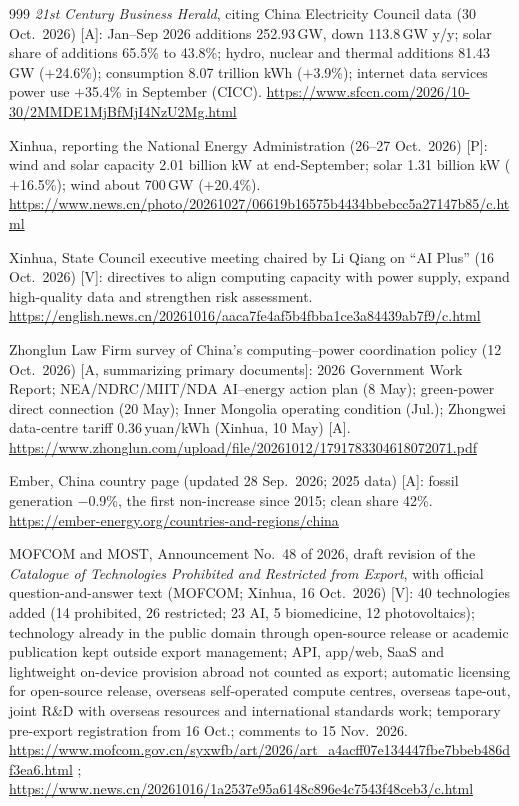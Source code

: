 \begin{thebibliography}{999}
 \emph{21st Century Business Herald}, citing China Electricity Council data (30 Oct.\ 2026) [A]: Jan--Sep 2026 additions 252.93\,GW, down 113.8\,GW y/y; solar share of additions 65.5\% to 43.8\%; hydro, nuclear and thermal additions 81.43\,GW ($+$24.6\%); consumption 8.07 trillion kWh ($+$3.9\%); internet data services power use $+$35.4\% in September (CICC). \url{https://www.sfccn.com/2026/10-30/2MMDE1MjBfMjI4NzU2Mg.html}

 Xinhua, reporting the National Energy Administration (26--27 Oct.\ 2026) [P]: wind and solar capacity 2.01 billion kW at end-September; solar 1.31 billion kW ($+$16.5\%); wind about 700\,GW ($+$20.4\%). \url{https://www.news.cn/photo/20261027/06619b16575b4434bbebcc5a27147b85/c.html}

 Xinhua, State Council executive meeting chaired by Li Qiang on ``AI Plus'' (16 Oct.\ 2026) [V]: directives to align computing capacity with power supply, expand high-quality data and strengthen risk assessment. \url{https://english.news.cn/20261016/aaca7fe4af5b4fbba1ce3a84439ab7f9/c.html}

 Zhonglun Law Firm survey of China's computing--power coordination policy (12 Oct.\ 2026) [A, summarizing primary documents]: 2026 Government Work Report; NEA/NDRC/MIIT/NDA AI--energy action plan (8 May); green-power direct connection (20 May); Inner Mongolia operating condition (Jul.); Zhongwei data-centre tariff 0.36\,yuan/kWh (Xinhua, 10 May) [A]. \url{https://www.zhonglun.com/upload/file/20261012/1791783304618072071.pdf}

 Ember, China country page (updated 28 Sep.\ 2026; 2025 data) [A]: fossil generation $-$0.9\%, the first non-increase since 2015; clean share 42\%. \url{https://ember-energy.org/countries-and-regions/china}


 MOFCOM and MOST, Announcement No.~48 of 2026, draft revision of the \emph{Catalogue of Technologies Prohibited and Restricted from Export}, with official question-and-answer text (MOFCOM; Xinhua, 16 Oct.\ 2026) [V]: 40 technologies added (14 prohibited, 26 restricted; 23 AI, 5 biomedicine, 12 photovoltaics); technology already in the public domain through open-source release or academic publication kept outside export management; API, app/web, SaaS and lightweight on-device provision abroad not counted as export; automatic licensing for open-source release, overseas self-operated compute centres, overseas tape-out, joint R\&D with overseas resources and international standards work; temporary pre-export registration from 16 Oct.; comments to 15 Nov.\ 2026. \url{https://www.mofcom.gov.cn/syxwfb/art/2026/art_a4acff07e134447fbe7bbeb486df3ea6.html} ; \url{https://www.news.cn/20261016/1a2537e95a6148c896e4c7543f48ceb3/c.html}


\end{thebibliography}
